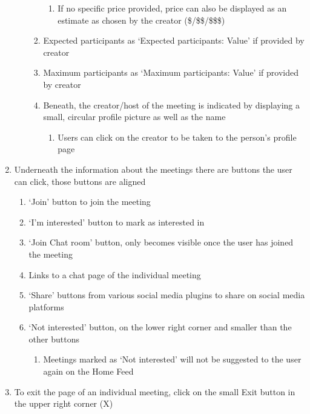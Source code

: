 \documentclass[conference]{IEEEtran}
\begin{document}
\begin{enumerate}
\begin{enumerate}
\begin{enumerate}
\begin{enumerate}
                \item If no specific price provided, price can also be displayed as an estimate as chosen by the creator (\$/\$\$/\$\$\$)
            \end{enumerate}
            \item Expected participants as ‘Expected participants: Value’ if provided by creator
            \item Maximum participants as ‘Maximum participants: Value’ if provided by creator
            \item Beneath, the creator/host of the meeting is indicated by displaying a small, circular profile picture as well as the name
            \begin{enumerate}
                \item Users can click on the creator to be taken to the person’s profile page
            \end{enumerate}
        \end{enumerate}
    \end{enumerate}
    \item Underneath the information about the meetings there are buttons the user can click, those buttons are aligned
    \begin{enumerate}
        \item ‘Join’ button to join the meeting
        \item ‘I’m interested’ button to mark as interested in
        \item ‘Join Chat room’ button, only becomes visible once the user has joined the meeting
        \item Links to a chat page of the individual meeting
        \item ‘Share’ buttons from various social media plugins to share on social media platforms
        \item ‘Not interested’ button, on the lower right corner and smaller than the other buttons
        \begin{enumerate}
            \item Meetings marked as ‘Not interested’ will not be suggested to the user again on the Home Feed
        \end{enumerate}
    \end{enumerate}
    \item To exit the page of an individual meeting, click on the small Exit button in the upper right corner (X)
\end{enumerate}
\end{document}

